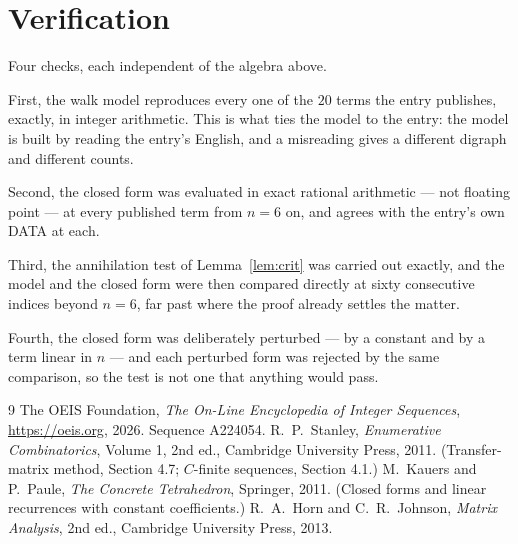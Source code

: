 \documentclass[11pt,a4paper]{article}
\theoremstyle{plain}
\theoremstyle{definition}
\begin{document}
\section{Verification}

Four checks, each independent of the algebra above.

First, the walk model reproduces every one of the $20$ terms the entry publishes,
exactly, in integer arithmetic. This is what ties the model to the entry: the model is built
by reading the entry's English, and a misreading gives a different digraph and different
counts.

Second, the closed form was evaluated in exact rational arithmetic --- not floating point ---
at every published term from $n=6$ on, and agrees with the entry's own DATA at each.

Third, the annihilation test of Lemma~\ref{lem:crit} was carried out exactly, and the model
and the closed form were then compared directly at sixty consecutive indices beyond
$n=6$, far past where the proof already settles the matter.

Fourth, the closed form was deliberately perturbed --- by a constant and by a term linear in
$n$ --- and each perturbed form was rejected by the same comparison, so the test is not one
that anything would pass.

\begin{thebibliography}{9}
 The OEIS Foundation, \emph{The On-Line Encyclopedia of Integer
Sequences}, \url{https://oeis.org}, 2026. Sequence A224054.
 R.~P.~Stanley, \emph{Enumerative Combinatorics}, Volume 1, 2nd ed.,
Cambridge University Press, 2011. (Transfer-matrix method, Section 4.7; $C$-finite sequences,
Section 4.1.)
 M.~Kauers and P.~Paule, \emph{The Concrete Tetrahedron}, Springer, 2011.
(Closed forms and linear recurrences with constant coefficients.)
 R.~A.~Horn and C.~R.~Johnson, \emph{Matrix Analysis}, 2nd ed., Cambridge
University Press, 2013.
\end{thebibliography}
\end{document}
